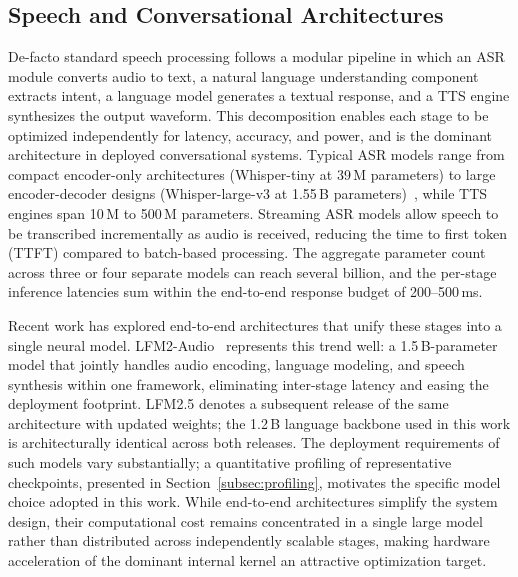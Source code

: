 \subsection{Speech and Conversational Architectures}
De-facto standard speech processing follows a modular pipeline in which an ASR
module converts audio to text, a natural language understanding component extracts
intent, a language model generates a textual response, and a TTS engine synthesizes
the output waveform. This decomposition enables each stage to be optimized
independently for latency, accuracy, and power, and is the dominant architecture in
deployed conversational systems. Typical ASR models range from compact encoder-only
architectures (Whisper-tiny at 39\,M parameters) to large encoder-decoder designs
(Whisper-large-v3 at 1.55\,B parameters)~\cite{radford2023whisper}, while TTS
engines span 10\,M to 500\,M parameters. Streaming ASR models allow speech to be
transcribed incrementally as audio is received, reducing the time to first token
(TTFT) compared to batch-based processing. The aggregate parameter count across
three or four separate models can reach several billion, and the per-stage inference
latencies sum within the end-to-end response budget of 200--500\,ms.

Recent work has explored end-to-end architectures that unify these stages into a
single neural model. LFM2-Audio~\cite{amini2025lfm2technicalreport} represents this
trend well: a 1.5\,B-parameter model that jointly handles audio encoding, language
modeling, and speech synthesis within one framework, eliminating inter-stage latency
and easing the deployment footprint. LFM2.5 denotes a subsequent release of the same
architecture with updated weights; the 1.2\,B language backbone used in this work is
architecturally identical across both releases. The deployment requirements of such
models vary substantially; a quantitative profiling of representative checkpoints,
presented in Section~\ref{subsec:profiling}, motivates the specific model choice
adopted in this work. While end-to-end architectures simplify the system design,
their computational cost remains concentrated in a single large model rather than
distributed across independently scalable stages, making hardware acceleration of the
dominant internal kernel an attractive optimization target.

